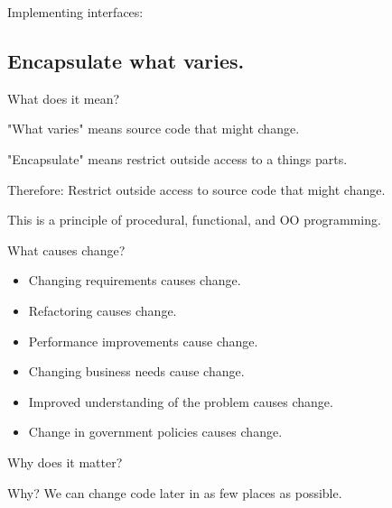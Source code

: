 \documentclass{beamer}
\begin{document}
\begin{frame}{Implementing interfaces:}
    
\end{frame}

\subsection{Encapsulate what varies.}

\begin{frame}{What does it mean?}
    \par "What varies" means source code that might change.
    \par "Encapsulate" means restrict outside access to a things parts.
    \par Therefore: Restrict outside access to source code that might change.
    \par This is a principle of procedural, functional, and OO programming.
\end{frame}

\begin{frame}{What causes change?}
    \begin{itemize}
        \item Changing requirements causes change.
        \item Refactoring causes change. 
        \item Performance improvements cause change. 
        \item Changing business needs cause change. 
        \item Improved understanding of the problem causes change. 
        \item Change in government policies causes change.
    \end{itemize}
\end{frame}

\begin{frame}{Why does it matter?}
    \par Why? We can change code later in as few places as possible.
\end{frame}

\begin{frame}{}
    
\end{frame}

\begin{frame}{}
    
\end{frame}
\end{document}
